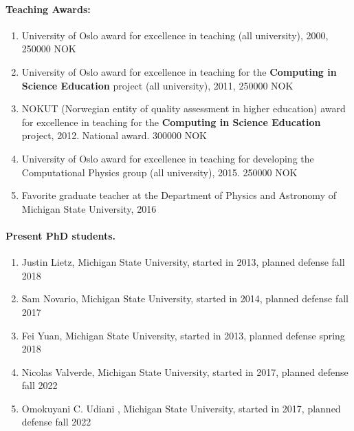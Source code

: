 \documentclass[a4wide,10pt]{article}
\begin{document}
\paragraph{Teaching Awards:}
\begin{enumerate}
\item University of Oslo award for excellence in teaching (all university), 2000, 250000 NOK

\item University of Oslo award for excellence in teaching for the \textbf{Computing in Science Education} project (all university), 2011, 250000 NOK

\item NOKUT (Norwegian entity of quality assessment in higher education) award for excellence in teaching for the \textbf{Computing in Science Education} project, 2012. National award. 300000 NOK

\item University of Oslo award for excellence in teaching for developing the Computational Physics group (all university), 2015. 250000 NOK

\item Favorite graduate teacher at the Department of Physics and Astronomy of Michigan State University, 2016 
\end{enumerate}

\paragraph{Present PhD students.}
\begin{enumerate}
\item Justin Lietz, Michigan State University, started in 2013, planned defense fall 2018

\item Sam Novario, Michigan State University, started in 2014, planned defense fall 2017

\item Fei Yuan, Michigan State University, started in 2013, planned defense spring 2018

\item Nicolas Valverde, Michigan State University, started in 2017, planned defense fall 2022

\item Omokuyani C. Udiani , Michigan State University, started in 2017, planned defense fall 2022
\end{enumerate}

\end{document}

